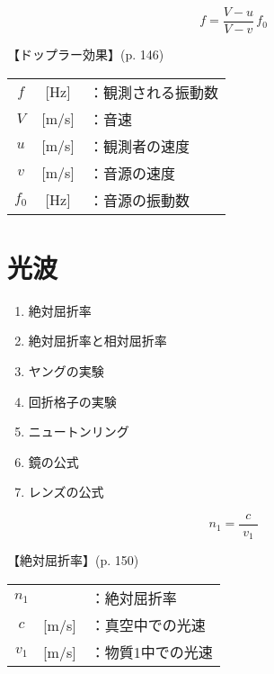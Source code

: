 \documentclass[10pt]{jarticle}
\begin{document}
\newpage






\[
f = \frac{V-u}{V-v}\, f_0
\]


\vskip3mm
【ドップラー効果】{\footnotesize (p. 146)}

\begin{tabular}{ccl}
$f$	&[Hz]	&：観測される振動数\\
$V$	&[m/s]	&：音速\\
$u$	&[m/s]	&：観測者の速度\\
$v$	&[m/s]	&：音源の速度\\
$f_0$	&[Hz]	&：音源の振動数\\
\end{tabular}

\newpage




\newpage
\addtocounter{page}{-1}
\thispagestyle{empty}
\section{光波}

\begin{enumerate}
\setcounter{enumi}{\thepage}
\small
\itemsep-4mm
\item 絶対屈折率\\
\item 絶対屈折率と相対屈折率\\
\item ヤングの実験\\
\item 回折格子の実験\\
\item ニュートンリング\\
\item 鏡の公式\\
\item レンズの公式\\
\end{enumerate}
\newpage




\[
n_1 = \frac{c}{\; v_1 \;}
\]


\vskip3mm
【絶対屈折率】{\footnotesize (p. 150)}

\begin{tabular}{ccl}
$n_1$	&	&：絶対屈折率\\
$c$	& [m/s]	&：真空中での光速\\
$v_1$	& [m/s]	&：物質1中での光速\\
\end{tabular}
\end{document}
